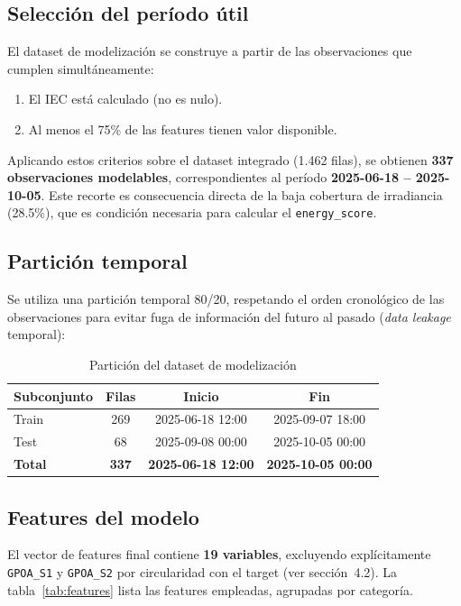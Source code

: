 \documentclass[12pt,a4paper]{article}
\begin{document}
\subsection{Selección del período útil}

El dataset de modelización se construye a partir de las observaciones que cumplen
simultáneamente:
\begin{enumerate}[noitemsep]
    \item El IEC está calculado (no es nulo).
    \item Al menos el 75\% de las features tienen valor disponible.
\end{enumerate}

Aplicando estos criterios sobre el dataset integrado (1.462 filas), se obtienen
\textbf{337 observaciones modelables}, correspondientes al período
\textbf{2025-06-18 -- 2025-10-05}. Este recorte es consecuencia directa de la baja
cobertura de irradiancia (28.5\%), que es condición necesaria para calcular el
\texttt{energy\_score}.

\subsection{Partición temporal}

Se utiliza una partición temporal 80/20, respetando el orden cronológico de las
observaciones para evitar fuga de información del futuro al pasado (\textit{data leakage}
temporal):

\begin{table}[H]
\centering
\caption{Partición del dataset de modelización}
\label{tab:split}
\begin{tabular}{lccc}
\toprule
\textbf{Subconjunto} & \textbf{Filas} & \textbf{Inicio} & \textbf{Fin} \\
\midrule
Train & 269 & 2025-06-18 12:00 & 2025-09-07 18:00 \\
Test  &  68 & 2025-09-08 00:00 & 2025-10-05 00:00 \\
\midrule
\textbf{Total} & \textbf{337} & \textbf{2025-06-18 12:00} & \textbf{2025-10-05 00:00} \\
\bottomrule
\end{tabular}
\end{table}

\subsection{Features del modelo}

El vector de features final contiene \textbf{19 variables}, excluyendo explícitamente
\texttt{GPOA\_S1} y \texttt{GPOA\_S2} por circularidad con el target (ver
sección~4.2). La tabla~\ref{tab:features} lista las features empleadas, agrupadas
por categoría.
\end{document}
